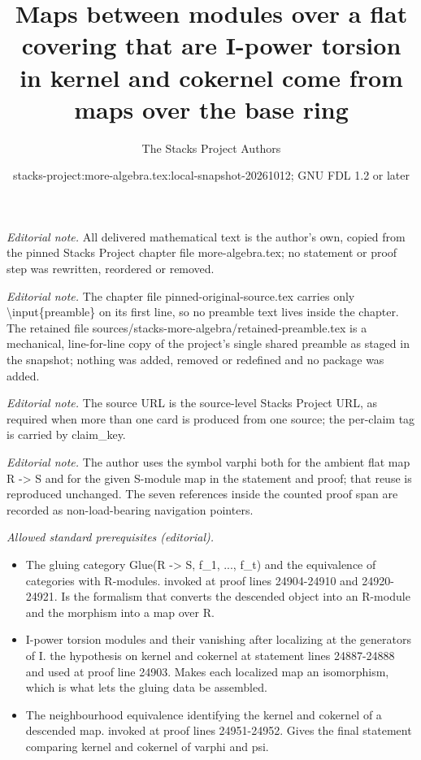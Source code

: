 \documentclass[10pt,a4paper]{amsart}
\title{Maps between modules over a flat covering that are I-power torsion in kernel and cokernel come from maps over the base ring}
\author{The Stacks Project Authors}
\date{stacks-project:more-algebra.tex:local-snapshot-20261012; GNU FDL 1.2 or later}
\theoremstyle{plain}
\theoremstyle{definition}
\theoremstyle{remark}
\numberwithin{equation}{subsection}
\begin{document}
\maketitle
\setcounter{subsection}{1}
\noindent\textit{Editorial note.} All delivered mathematical text is the author's own, copied from the pinned Stacks Project chapter file more-algebra.tex; no statement or proof step was rewritten, reordered or removed.\par\medskip
\noindent\textit{Editorial note.} The chapter file pinned-original-source.tex carries only \textbackslash{}input\{preamble\} on its first line, so no preamble text lives inside the chapter. The retained file sources/stacks-more-algebra/retained-preamble.tex is a mechanical, line-for-line copy of the project's single shared preamble as staged in the snapshot; nothing was added, removed or redefined and no package was added.\par\medskip
\noindent\textit{Editorial note.} The source URL is the source-level Stacks Project URL, as required when more than one card is produced from one source; the per-claim tag is carried by claim\_key.\par\medskip
\noindent\textit{Editorial note.} The author uses the symbol varphi both for the ambient flat map R -> S and for the given S-module map in the statement and proof; that reuse is reproduced unchanged. The seven references inside the counted proof span are recorded as non-load-bearing navigation pointers.\par\medskip
\noindent\textit{Allowed standard prerequisites (editorial).}\begin{itemize}
\item The gluing category Glue(R -> S, f\_1, ..., f\_t) and the equivalence of categories with R-modules. invoked at proof lines 24904-24910 and 24920-24921. Is the formalism that converts the descended object into an R-module and the morphism into a map over R.
\item I-power torsion modules and their vanishing after localizing at the generators of I. the hypothesis on kernel and cokernel at statement lines 24887-24888 and used at proof line 24903. Makes each localized map an isomorphism, which is what lets the gluing data be assembled.
\item The neighbourhood equivalence identifying the kernel and cokernel of a descended map. invoked at proof lines 24951-24952. Gives the final statement comparing kernel and cokernel of varphi and psi.
\end{itemize}\medskip
\end{document}
